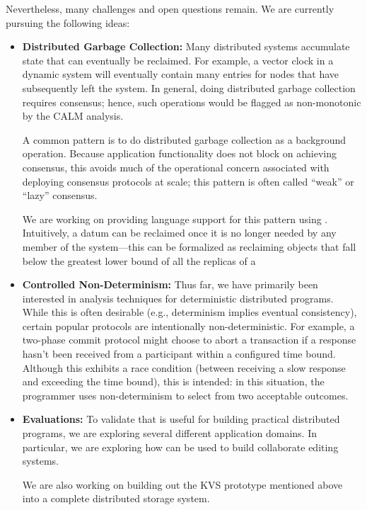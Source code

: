 Nevertheless, many challenges and open questions remain. We are currently
pursuing the following ideas:
\begin{itemize}
\item \textbf{Distributed Garbage Collection:} Many distributed systems
  accumulate state that can eventually be reclaimed. For example, a vector clock
  in a dynamic system will eventually contain many entries for nodes that have
  subsequently left the system. In general, doing distributed garbage collection
  requires consensus; hence, such operations would be flagged as non-monotonic
  by the CALM analysis.

  A common pattern is to do distributed garbage collection as a background
  operation. Because application functionality does not block on achieving
  consensus, this avoids much of the operational concern associated with
  deploying consensus protocols at scale; this pattern is often called ``weak''
  or ``lazy'' consensus.

  We are working on providing language support for this pattern using
  \blooml. Intuitively, a datum can be reclaimed once it is no longer needed by
  any member of the system---this can be formalized as reclaiming objects that
  fall below the greatest lower bound of all the replicas of a 

\item \textbf{Controlled Non-Determinism:} Thus far, we have primarily been
  interested in analysis techniques for deterministic distributed
  programs. While this is often desirable (e.g., determinism implies eventual
  consistency), certain popular protocols are intentionally
  non-deterministic. For example, a two-phase commit protocol might choose to
  abort a transaction if a response hasn't been received from a participant
  within a configured time bound. Although this exhibits a race condition
  (between receiving a slow response and exceeding the time bound), this is
  intended: in this situation, the programmer uses non-determinism to select
  from two acceptable outcomes.

\item \textbf{Evaluations:} To validate that \blooml is useful for building
  practical distributed programs, we are exploring several different application
  domains. In particular, we are exploring how \blooml can be used to build
  collaborate editing systems.

  We are also working on building out the KVS prototype mentioned above into a
  complete distributed storage system.
\end{itemize}

